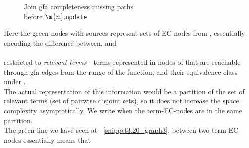 \begin{figure}[H]
\caption{
Join gfa completeness missing paths\\
before $\m{n}$.\lstinline{update}
}
\label{snippet3.22_graph6}
\end{figure}
Here the green nodes with sources represent sets of EC-nodes from , essentially encoding the difference between,
 and \\
\\
restricted to \emph{relevant terms} - terms represented in nodes of  that are reachable through gfa edges from the range of the  function, and their equivalence class under .\\
The actual representation of this information would be a partition of the set of relevant terms (set of pairwise disjoint sets), so it does not increase the space complexity asymptotically. We write  when the term-EC-nodes  are in the same partition.\\
The green line we have seen at ~\ref{snippet3.20_graph3}, between two  term-EC-nodes  essentially means that
